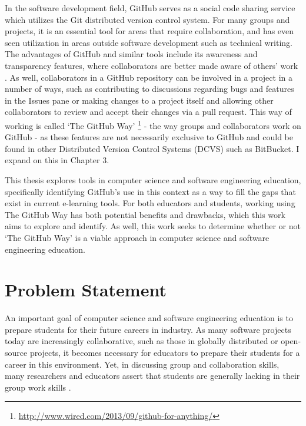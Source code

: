 In the software development field, GitHub serves as a social code sharing service which utilizes the Git distributed version control system. For many groups and projects, it is an essential tool for areas that require collaboration, and has even seen utilization in areas outside software development such as technical writing. The advantages of GitHub and similar tools include its awareness and transparency features, where collaborators are better made aware of others' work \cite{dabbish2012social}. As well, collaborators in a GitHub repository can be involved in a project in a number of ways, such as contributing to discussions regarding bugs and features in the Issues pane or making changes to a project itself and allowing other collaborators to review and accept their changes via a pull request. This way of working is called `The GitHub Way' \footnote{\url{http://www.wired.com/2013/09/github-for-anything/}} - the way groups and collaborators work on GitHub - as these features are not necessarily exclusive to GitHub and could be found in other Distributed Version Control Systems (DCVS) such as BitBucket. I expand on this in Chapter 3.

This thesis explores tools in computer science and software engineering education, specifically identifying GitHub's use in this context as a way to fill the gaps that exist in current e-learning tools. For both educators and students, working using The GitHub Way has both potential benefits and drawbacks, which this work aims to explore and identify. As well, this work seeks to determine whether or not `The GitHub Way' is a viable approach in computer science and software engineering education.

\section{Problem Statement}
An important goal of computer science and software engineering education is to prepare students for their future careers in industry. As many software projects today are increasingly collaborative, such as those in globally distributed or open-source projects, it becomes necessary for educators to prepare their students for a career in this environment. Yet, in discussing group and collaboration skills, many researchers and educators assert that students are generally lacking in their group work skills \cite{waite2004student}.

